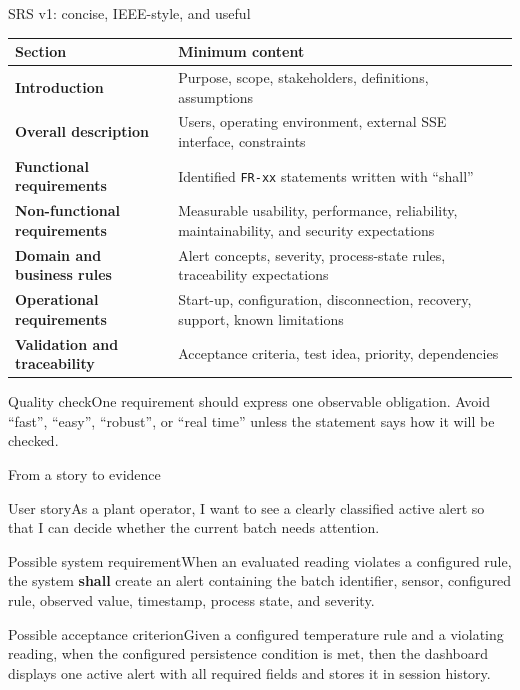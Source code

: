 \begin{frame}{SRS v1: concise, IEEE-style, and useful}
\begin{tabularx}{\textwidth}{>{\bfseries}l X}
Section & Minimum content \\
\toprule
Introduction & Purpose, scope, stakeholders, definitions, assumptions \\
Overall description & Users, operating environment, external SSE interface, constraints \\
Functional requirements & Identified \texttt{FR-xx} statements written with ``shall'' \\
Non-functional requirements & Measurable usability, performance, reliability, maintainability, and security expectations \\
Domain and business rules & Alert concepts, severity, process-state rules, traceability expectations \\
Operational requirements & Start-up, configuration, disconnection, recovery, support, known limitations \\
Validation and traceability & Acceptance criteria, test idea, priority, dependencies \\
\bottomrule
\end{tabularx}
\vspace{0.3em}\begin{block}{Quality check}One requirement should express one observable obligation. Avoid ``fast'', ``easy'', ``robust'', or ``real time'' unless the statement says how it will be checked.\end{block}
\coursefooter
\end{frame}

\begin{frame}{From a story to evidence}
\begin{block}{User story}As a plant operator, I want to see a clearly classified active alert so that I can decide whether the current batch needs attention.\end{block}
\begin{block}{Possible system requirement}When an evaluated reading violates a configured rule, the system \textbf{shall} create an alert containing the batch identifier, sensor, configured rule, observed value, timestamp, process state, and severity.\end{block}
\begin{block}{Possible acceptance criterion}Given a configured temperature rule and a violating reading, when the configured persistence condition is met, then the dashboard displays one active alert with all required fields and stores it in session history.\end{block}
\coursefooter
\end{frame}

